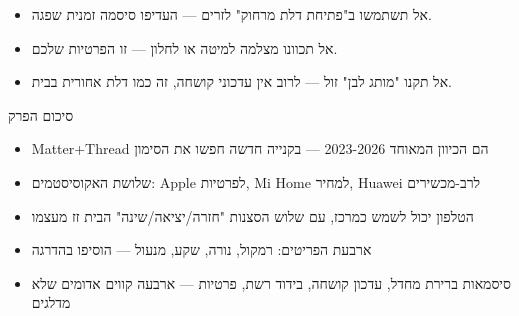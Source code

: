 \begin{itemize}
  \item אל תשתמשו ב"פתיחת דלת מרחוק" לזרים — העדיפו סיסמה זמנית שפגה.
  \item אל תכוונו מצלמה למיטה או לחלון — זו הפרטיות שלכם.
  \item אל תקנו "מותג לבן" זול — לרוב אין עדכוני קושחה, זה כמו דלת אחורית בבית.
\end{itemize}

\begin{tcbsummary}{סיכום הפרק}
\begin{itemize}
  \item Matter+Thread הם הכיוון המאוחד 2023-2026 — בקנייה חדשה חפשו את הסימון
  \item שלושת האקוסיסטמים: Apple לפרטיות, Mi Home למחיר, Huawei לרב-מכשירים
  \item הטלפון יכול לשמש כמרכז, עם שלוש הסצנות "חזרה/יציאה/שינה" הבית זז מעצמו
  \item ארבעת הפריטים: רמקול, נורה, שקע, מנעול — הוסיפו בהדרגה
  \item סיסמאות ברירת מחדל, עדכון קושחה, בידוד רשת, פרטיות — ארבעה קווים אדומים שלא מדלגים
\end{itemize}

\end{tcbsummary}
